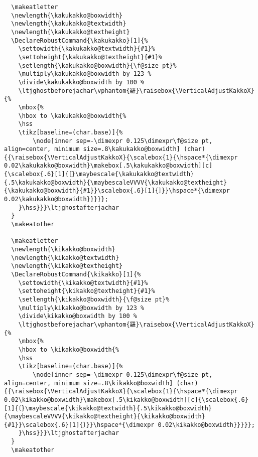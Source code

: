 \documentclass[luatex,fontsize=10pt,paper=b5,twoside]{jlreq}%
\begin{document}
\begin{lstlisting}
  \makeatletter
  \newlength{\kakukakko@boxwidth}
  \newlength{\kakukakko@textwidth}
  \newlength{\kakukakko@textheight}
  \DeclareRobustCommand{\kakukakko}[1]{%
    \settowidth{\kakukakko@textwidth}{#1}%
    \settoheight{\kakukakko@textheight}{#1}%
    \setlength{\kakukakko@boxwidth}{\f@size pt}%
    \multiply\kakukakko@boxwidth by 123 %
    \divide\kakukakko@boxwidth by 100 %
    \ltjghostbeforejachar\vphantom{羅}\raisebox{\VerticalAdjustKakkoX}{%
    \mbox{%
    \hbox to \kakukakko@boxwidth{%
    \hss
    \tikz[baseline=(char.base)]{%
        \node[inner sep=-\dimexpr 0.125\dimexpr\f@size pt, align=center, minimum size=.8\kakukakko@boxwidth] (char) {{\raisebox{\VerticalAdjustKakkoX}{\scalebox{1}{\hspace*{\dimexpr 0.02\kakukakko@boxwidth}\makebox[.5\kakukakko@boxwidth][c]{\scalebox{.6}[1]{［}\maybescale{\kakukakko@textwidth}{.5\kakukakko@boxwidth}{\maybescaleVVVV{\kakukakko@textheight}{\kakukakko@boxwidth}{#1}}\scalebox{.6}[1]{］}}\hspace*{\dimexpr 0.02\kakukakko@boxwidth}}}}};
    }\hss}}}\ltjghostafterjachar
  }
  \makeatother

  \makeatletter
  \newlength{\kikakko@boxwidth}
  \newlength{\kikakko@textwidth}
  \newlength{\kikakko@textheight}
  \DeclareRobustCommand{\kikakko}[1]{%
    \settowidth{\kikakko@textwidth}{#1}%
    \settoheight{\kikakko@textheight}{#1}%
    \setlength{\kikakko@boxwidth}{\f@size pt}%
    \multiply\kikakko@boxwidth by 123 %
    \divide\kikakko@boxwidth by 100 %
    \ltjghostbeforejachar\vphantom{羅}\raisebox{\VerticalAdjustKakkoX}{%
    \mbox{%
    \hbox to \kikakko@boxwidth{%
    \hss
    \tikz[baseline=(char.base)]{%
        \node[inner sep=-\dimexpr 0.125\dimexpr\f@size pt, align=center, minimum size=.8\kikakko@boxwidth] (char) {{\raisebox{\VerticalAdjustKakkoX}{\scalebox{1}{\hspace*{\dimexpr 0.02\kikakko@boxwidth}\makebox[.5\kikakko@boxwidth][c]{\scalebox{.6}[1]{〔}\maybescale{\kikakko@textwidth}{.5\kikakko@boxwidth}{\maybescaleVVVV{\kikakko@textheight}{\kikakko@boxwidth}{#1}}\scalebox{.6}[1]{〕}}\hspace*{\dimexpr 0.02\kikakko@boxwidth}}}}};
    }\hss}}}\ltjghostafterjachar
  }
  \makeatother


\end{lstlisting}
\end{document}
